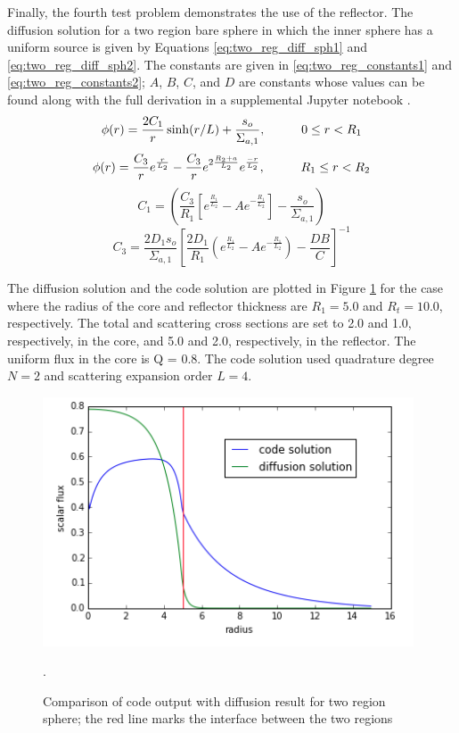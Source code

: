 \documentclass[11pt, oneside]{article}   	%
\newcommand\tab[1][1cm]{\hspace*{#1}}				%
\begin{document}
Finally, the fourth test problem demonstrates the use of the reflector. The diffusion solution for a two region bare sphere in which the inner sphere has a uniform source is given by Equations \ref{eq:two_reg_diff_sph1} and \ref{eq:two_reg_diff_sph2}. The constants are given in \ref{eq:two_reg_constants1} and \ref{eq:two_reg_constants2}; $A$, $B$, $C$, and $D$ are constants whose values can be found along with the full derivation in a supplemental Jupyter notebook \cite{lewis_fundamentals}.
%
\begin{equation}
\begin{aligned}
\phi(r) = \frac{2C_1}{r}\sinh(r/L)+\frac{s_o}{\Sigma_{a,1}}, \tab 0 \le r < R_{1}
\end{aligned}
\label{eq:two_reg_diff_sph1}
\end{equation}
%
\begin{equation}
\phi(r) = \frac{C_3}{r}e^{\frac{r}{L_2}}
-\frac{C_3}{r}e^{2\frac{R_2+a}{L_2}}e^{\frac{-r}{L_2}}, \tab R_1 \le r < R_2
\label{eq:two_reg_diff_sph2}
\end{equation}
%
\begin{equation}
C_1 =\left(\frac{C_3}{R_1}\left[e^{\frac{R_1}{L_2}}-Ae^{-\frac{R_1}{L_2}}\right] - \frac{s_o}{\Sigma_{a,1}}\right)
\label{eq:two_reg_constants1}
\end{equation}
%
\begin{equation}
C_3 = \frac{2 D_1 s_o}{\Sigma_{a,1}}
\left[\frac{2 D_1}{R_1}\left(e^{\frac{R_1}{L_2}}
-Ae^{-\frac{R_1}{L_2}}\right)-\frac{DB}{C} \right]^{-1}
\label{eq:two_reg_constants2}
\end{equation}

The diffusion solution and the code solution are plotted in Figure \ref{fig:refl_soln} for the case where the radius of the core and reflector thickness are $R_1 = 5.0$ and $R_t = 10.0$, respectively. The total and scattering cross sections are set to 2.0 and 1.0, respectively, in the core, and 5.0 and 2.0, respectively, in the reflector. The uniform flux in the core is Q = 0.8. The code solution used quadrature degree $N=2$ and scattering expansion order $L=4$.
%
\begin{figure}
\centering
\includegraphics[width=11cm]{reflector_result}
\caption{Comparison of code output with diffusion result for two region sphere; the red line marks the interface between the two regions}.
\label{fig:refl_soln}
\end{figure}
\end{document}
